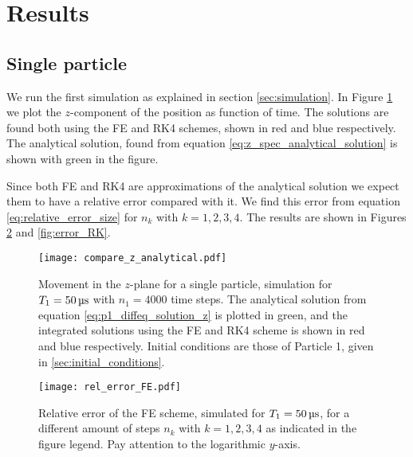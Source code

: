 \section{Results}\label{sec:results}

\subsection{Single particle}\label{sec:one_particle}
We run the first simulation as explained in section \ref{sec:simulation}. In Figure \ref{fig:compare_z_analytical} we plot the $z$-component of the position as function of time. The solutions are found both using the FE and RK4 schemes, shown in red and blue respectively. The analytical solution, found from equation \eqref{eq:z_spec_analytical_solution} is shown with green in the figure.

Since both FE and RK4 are approximations of the analytical solution we expect them to have a relative error compared with it. We find this error from equation \eqref{eq:relative_error_size} for $n_k$ with $k=1,2,3,4$. The results are shown in Figures \ref{fig:error_FE} and \ref{fig:error_RK}. 

\begin{figure}
    \texttt{[image: compare\_z\_analytical.pdf]}
    \caption{Movement in the $z$-plane for a single particle, simulation for $T_1=50\,\mus$ with $n_1=4000$ time steps. The analytical solution from equation \eqref{eq:p1_diffeq_solution_z} is plotted in green, and the integrated solutions using the FE and RK4 scheme is shown in red and blue respectively. Initial conditions are those of Particle 1, given in \ref{sec:initial_conditions}.}
    \label{fig:compare_z_analytical}
\end{figure}


\begin{figure}
    \texttt{[image: rel\_error\_FE.pdf]}
    \caption{Relative error of the FE scheme, simulated for $T_1=50\,\mus$, for a different amount of steps $n_k$ with $k=1,2,3,4$ as indicated in the figure legend. Pay attention to the logarithmic $y$-axis.}
    \label{fig:error_FE}
\end{figure}


